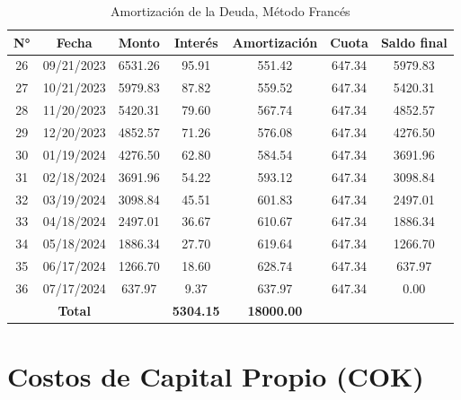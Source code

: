 \documentclass[a4paper,openright,12pt]{book}
\begin{document}
\begin{table}[]
\begin{tabular}{ccccccc}
\hline
\textbf{N°} & \textbf{Fecha} & \textbf{Monto} & \textbf{Interés} & \textbf{Amortización} & \textbf{Cuota} & \textbf{Saldo final} \\ \hline
26          & 09/21/2023     & 6531.26        & 95.91            & 551.42                & 647.34         & 5979.83              \\
27          & 10/21/2023     & 5979.83        & 87.82            & 559.52                & 647.34         & 5420.31              \\
28          & 11/20/2023     & 5420.31        & 79.60            & 567.74                & 647.34         & 4852.57              \\
29          & 12/20/2023     & 4852.57        & 71.26            & 576.08                & 647.34         & 4276.50              \\
30          & 01/19/2024     & 4276.50        & 62.80            & 584.54                & 647.34         & 3691.96              \\
31          & 02/18/2024     & 3691.96        & 54.22            & 593.12                & 647.34         & 3098.84              \\
32          & 03/19/2024     & 3098.84        & 45.51            & 601.83                & 647.34         & 2497.01              \\
33          & 04/18/2024     & 2497.01        & 36.67            & 610.67                & 647.34         & 1886.34              \\
34          & 05/18/2024     & 1886.34        & 27.70            & 619.64                & 647.34         & 1266.70              \\
35          & 06/17/2024     & 1266.70        & 18.60            & 628.74                & 647.34         & 637.97               \\
36          & 07/17/2024     & 637.97         & 9.37             & 637.97                & 647.34         & 0.00                 \\ \hline
\textbf{}   & \textbf{Total} & \textbf{}      & \textbf{5304.15} & \textbf{18000.00}     & \textbf{}      & \textbf{}            \\ \hline
\end{tabular}
\caption{Amortización de la Deuda, Método Francés}
\label{Tabla12}
\end{table}

\section{Costos de Capital Propio (COK)}
\end{document}
